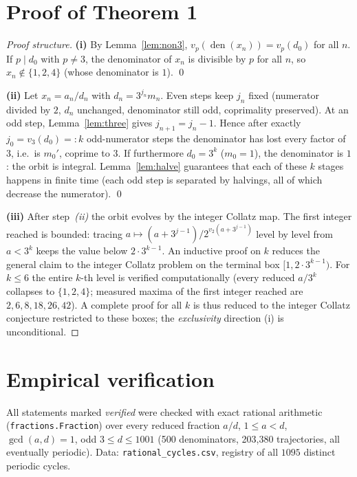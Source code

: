 \documentclass[11pt]{article}
\theoremstyle{remark}
\DeclareMathOperator{\den}{den}
\newcommand{\vthree}{v_3}
\newcommand{\vP}[1]{v_{#1}}
\begin{document}
\section{Proof of Theorem 1}
\begin{proof}[Proof structure]
\textbf{(i)} By Lemma~\ref{lem:non3}, \(\vP{p}(\den(x_n)) = \vP{p}(d_0)\) for all
\(n\). If \(p \mid d_0\) with \(p \ne 3\), the denominator of \(x_n\) is divisible
by \(p\) for all \(n\), so \(x_n \notin \{1, 2, 4\}\) (whose denominator is
\(1\)). \qed

\medskip
\textbf{(ii)} Let \(x_n = a_n/d_n\) with \(d_n = 3^{j_n} m_n\). Even steps keep
\(j_n\) fixed (numerator divided by \(2\), \(d_n\) unchanged, denominator still
odd, coprimality preserved). At an odd step, Lemma~\ref{lem:three} gives
\(j_{n+1} = j_n - 1\). Hence after exactly \(j_0 = \vthree(d_0) =: k\)
odd-numerator steps the denominator has lost every factor of \(3\), i.e.\ is
\(m_0'\), coprime to \(3\). If furthermore \(d_0 = 3^k\) (\(m_0 = 1\)), the
denominator is \(1\): the orbit is integral. Lemma~\ref{lem:halve} guarantees
that each of these \(k\) stages happens in finite time (each odd step is
separated by halvings, all of which decrease the numerator). \qed

\medskip
\textbf{(iii)} After step~\emph{(ii)} the orbit evolves by the integer Collatz
map. The first integer reached is bounded: tracing
\(a \mapsto (a + 3^{j-1})/2^{v_2(a + 3^{j-1})}\) level by level from
\(a < 3^{k}\) keeps the value below \(2 \cdot 3^{k-1}\). An inductive proof on
\(k\) reduces the general claim to the integer Collatz problem on the terminal
box \([1, 2\cdot 3^{k-1})\). For \(k \le 6\) the entire \(k\)-th level is
verified computationally (every reduced \(a/3^{k}\) collapses to \(\{1,2,4\}\);
measured maxima of the first integer reached are \(2, 6, 8, 18, 26, 42\)).
A complete proof for all \(k\) is thus reduced to the integer Collatz conjecture
restricted to these boxes; the \emph{exclusivity} direction (i) is unconditional.
\end{proof}

\section{Empirical verification}\label{sec:empirical}

All statements marked \emph{verified} were checked with exact rational
arithmetic (\texttt{fractions.Fraction}) over every reduced fraction \(a/d\),
\(1 \le a < d\), \(\gcd(a,d) = 1\), odd \(3 \le d \le 1001\) (500 denominators,
203{,}380 trajectories, all eventually periodic). Data: \texttt{rational\_cycles.csv},
registry of all \(1095\) distinct periodic cycles.
\end{document}

